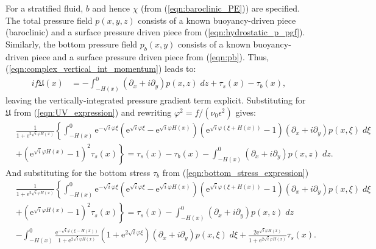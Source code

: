 \documentclass[10pt]{amsart}
\begin{document}
For a stratified fluid, $b$ and hence $\chi$ (from (\ref{eqn:baroclinic_PE})) are specified. 
The total pressure field $p(x,y,z)$ consists of a known buoyancy-driven piece (baroclinic) and a surface pressure driven piece from (\ref{eqn:hydrostatic_p_pgf}).
Similarly, the bottom pressure field $p_b(x,y)$ consists of a known buoyancy-driven piece and a surface pressure driven piece from (\ref{eqn:pb}).
Thus, (\ref{eqn:complex_vertical_int_momentum}) leads to:
\begin{align}
i f \mathfrak{U}(x) & = -
\int_{-H(x)}^{0} \left( \partial_x + i \partial_y \right) p(x,z) \; dz 
+ \tau_s(x)  - \tau_b (x) ,
\label{eqn:UV_expression1}
 \end{align}
 leaving the vertically-integrated pressure gradient term explicit.
 Substituting for $\mathfrak{U}$ from (\ref{eqn:UV_expression}) and rewriting $\varphi^2 = f / (\nu_0 \epsilon^2)$ gives:
 \begin{align}
& \frac{1 }{{ 1 + \mathrm{e}^{2 \sqrt{i} \varphi H(x )} } } 
\left\{
 \int_{-H(x)}^{0} 
\mathrm{e}^{-\sqrt{i} \varphi \xi} 
\left(
\mathrm{e}^{\sqrt{i} \varphi \xi} - 
\mathrm{e}^{\sqrt{i} \varphi H(x)} 
\right) \left(
\mathrm{e}^{\sqrt{i} \varphi  \left( \xi + H(x) \right)} - 1
\right)
 \left( \partial_x  + i \partial_y  \right) p( x, \xi)  \; d \xi  \right. \nonumber \\
& + \left.
\left( 
\mathrm{e}^{\sqrt{i} \varphi  H(x) }   - 1   
\right)^2
\tau_s (x)  \right\} 
= 
\tau_s (x)  - \tau_b (x) - 
\int_{-H(x)}^{0} \left( \partial_x + i \partial_y \right) p(x,z) \; dz .
\end{align}
And substituting for the bottom stress $\tau_b$ from (\ref{eqn:bottom_stress_expression})
 \begin{align}
& \frac{1 }{{1 + \mathrm{e}^{2 \sqrt{i} \varphi H(x )} } } 
\left\{
 \int_{-H(x)}^{0} 
\mathrm{e}^{-\sqrt{i} \varphi \xi} 
\left(
\mathrm{e}^{\sqrt{i} \varphi \xi} - 
\mathrm{e}^{\sqrt{i} \varphi H(x)} 
\right) \left(
\mathrm{e}^{\sqrt{i} \varphi  \left( \xi + H(x) \right)} - 1
\right)
 \left( \partial_x  + i \partial_y  \right) p( x, \xi) \; d \xi  \right. \nonumber \\
& +\left.
\left( 
\mathrm{e}^{\sqrt{i} \varphi  H(x) }   - 1   
\right)^2
\tau_s (x)   \right\} 
 =
 \tau_s (x)
 - \int_{-H(x)}^{0} \left( \partial_x + i \partial_y \right) p(x,z) \; dz  
 \nonumber \\
&- 
\int_{-H(x)}^{0} 
\frac{ \mathrm{e}^{-\sqrt{i} \varphi (\xi - H(x))  } }{ 1 + \mathrm{e}^{2 \sqrt{i} \varphi H \left(x \right)} }
\left( 1 + \mathrm{e}^{2 \sqrt{i} \varphi \xi}\right) 
 \left( \partial_x  + i \partial_y \right) p( x, \xi)  \; d \xi 
+\frac{ 2 \mathrm{e}^{\sqrt{i} \varphi H(x)  } }{ 1 + \mathrm{e}^{2 \sqrt{i} \varphi H \left(x \right)} }
\tau_s (x)
. \nonumber
\end{align}
\end{document}
